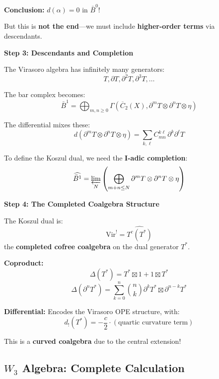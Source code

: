 \begin{example}
\textbf{Conclusion:} $d(\alpha) = 0$ in $\bar{B}^0$!

But this is \textbf{not the end}---we must include \textbf{higher-order terms} via descendants.

\medskip
\noindent\textbf{Step 3: Descendants and Completion}

The Virasoro algebra has infinitely many generators:
$$T, \partial T, \partial^2 T, \partial^3 T, \ldots$$

The bar complex becomes:
$$\bar{B}^1 = \bigoplus_{m,n \geq 0} \Gamma(\overline{C}_2(X), \partial^m T \otimes \partial^n T \otimes \eta)$$

The differential mixes these:
$$d(\partial^m T \otimes \partial^n T \otimes \eta) = \sum_{k,\ell} C_{mn}^{k\ell} \, \partial^k \partial^\ell T$$

To define the Koszul dual, we need the \textbf{I-adic completion}:
$$\widehat{\bar{B}^1} = \varprojlim_N \left(\bigoplus_{m+n \leq N} \partial^m T \otimes \partial^n T \otimes \eta\right)$$

\medskip
\noindent\textbf{Step 4: The Completed Coalgebra Structure}

The Koszul dual is:
$$\text{Vir}^! = \widehat{T^c(T^*)}$$
the \textbf{completed cofree coalgebra} on the dual generator $T^*$.

\textbf{Coproduct:}
$$\Delta(T^*) = T^* \boxtimes 1 + 1 \boxtimes T^*$$
$$\Delta(\partial^n T^*) = \sum_{k=0}^n \binom{n}{k} \partial^k T^* \boxtimes \partial^{n-k} T^*$$

\textbf{Differential:} Encodes the Virasoro OPE structure, with:
$$d_!(T^*) = -\frac{c}{2} \cdot (\text{quartic curvature term})$$

This is a \textbf{curved coalgebra} due to the central extension!
\end{example}


\subsection{$W_3$ Algebra: Complete Calculation}

